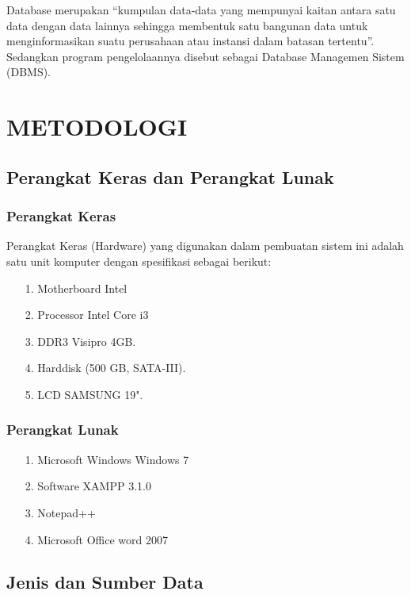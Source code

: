 \documentclass{jtetiproposalskripsi}
\begin{document}
Database merupakan “kumpulan data-data yang mempunyai kaitan antara satu data dengan data lainnya sehingga membentuk satu bangunan data untuk menginformasikan suatu perusahaan atau instansi dalam batasan tertentu”. Sedangkan program pengelolaannya disebut sebagai Database Managemen Sistem (DBMS).


\chapter{METODOLOGI}

\section{Perangkat Keras dan Perangkat Lunak}
\subsection{Perangkat Keras}
Perangkat Keras (Hardware) yang digunakan dalam pembuatan sistem ini adalah satu unit komputer dengan spesifikasi sebagai berikut:

\begin{itemize}
\item[1.] Motherboard Intel
\item[2.] Processor Intel Core i3
\item[3.] DDR3 Visipro 4GB.
\item[4.] Harddisk (500 GB, SATA-III).
\item[5.] LCD SAMSUNG 19".
\end{itemize}

\subsection{Perangkat Lunak}
\begin{itemize}
\item[1.] Microsoft Windows Windows 7
\item[2.] Software XAMPP 3.1.0
\item[3.] Notepad++
\item[4.] Microsoft Office word 2007
\end{itemize}

\section{Jenis dan Sumber Data}
\end{document}
